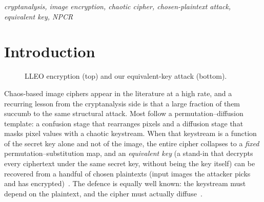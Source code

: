 \documentclass[conference,a4paper]{IEEEtran}
\begin{document}
\vspace{\dimexpr 10pt-\parskip\relax}
\begin{IEEEkeywords}
\itshape cryptanalysis, image encryption, chaotic cipher, chosen-plaintext attack, equivalent key, NPCR
\end{IEEEkeywords}

\linespread{0.95}\selectfont

\section{Introduction}
\begin{figure}[t]
\centering
\footnotesize
{}
\caption{LLEO encryption (top) and our equivalent-key attack (bottom).}
\label{fig:schema}
\end{figure}
Chaos-based image ciphers appear in the literature at a high rate, and a recurring lesson from the
cryptanalysis side is that a large fraction of them succumb to the same structural attack. Most follow
a permutation--diffusion template: a confusion stage that rearranges pixels and a diffusion stage that
masks pixel values with a chaotic keystream. When that keystream is a function of the secret key alone
and not of the image, the entire cipher collapses to a \emph{fixed} permutation--substitution map,
and an \emph{equivalent key} (a stand-in that decrypts every ciphertext under the same secret key,
without being the key itself) can be recovered from a handful of chosen plaintexts (input images the
attacker picks and has encrypted)~\cite{li2019attacker,li2018entropy,arroyo2009,li2011optimal}. The defence is equally
well known: the keystream must depend on the plaintext, and the cipher must actually
diffuse~\cite{alvarez2006}.
\end{document}
